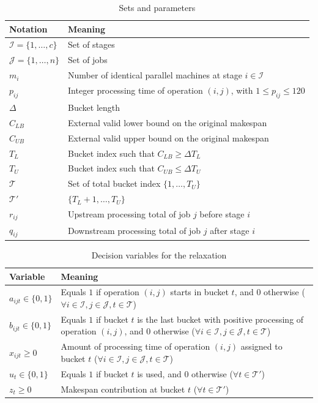 \documentclass[11pt]{article}
\begin{document}
\begin{table}[htbp]
\centering
\caption{Sets and parameters}
\label{tab:parameters}
\begin{tabular}{>{\raggedright\arraybackslash}p{} >{\raggedright\arraybackslash}p{}}
\toprule
Notation & Meaning \\
\midrule
$\mathcal{I}=\{1,\dots,c\}$ & Set of stages \\
$\mathcal{J}=\{1,\dots,n\}$ & Set of jobs \\
$m_i$ & Number of identical parallel machines at stage $i\in \mathcal{I}$ \\
$p_{ij}$ & Integer processing time of operation $(i,j)$, with $1\le p_{ij}\le 120$ \\
$\Delta$ & Bucket length \\
$C_{LB}$ & External valid lower bound on the original makespan \\
$C_{UB}$ & External valid upper bound on the original makespan \\
$T_L$ & Bucket index such that $C_{LB} \geq \Delta T_L$ \\
$T_U$ & Bucket index such that $C_{UB} \leq \Delta T_U$ \\
$\mathcal{T}$ & Set of total bucket index $\{1, \ldots, T_U\}$ \\
$\mathcal{T}'$ & $\{T_L+1, \ldots, T_U\}$ \\
$r_{ij}$ & Upstream processing total of job $j$ before stage $i$ \\
$q_{ij}$ & Downstream processing total of job $j$ after stage $i$ \\
\bottomrule
\end{tabular}
\end{table}

\begin{table}[htbp]
\centering
\caption{Decision variables for the relaxation}
\label{tab:variables}
\begin{tabular}{>{\raggedright\arraybackslash}p{} >{\raggedright\arraybackslash}p{}}
\toprule
Variable & Meaning \\
\midrule
$a_{ijt}\in\{0,1\}$ & Equals $1$ if operation $(i,j)$ starts in bucket $t$, and $0$ otherwise ($\forall i \in \mathcal{I}, j \in \mathcal{J}, t \in \mathcal{T}$) \\
$b_{ijt}\in\{0,1\}$ & Equals $1$ if bucket $t$ is the last bucket with positive processing of operation $(i,j)$, and $0$ otherwise ($\forall i \in \mathcal{I}, j \in \mathcal{J}, t \in \mathcal{T}$) \\
$x_{ijt}\ge 0$ & Amount of processing time of operation $(i,j)$ assigned to bucket $t$ ($\forall i \in \mathcal{I}, j \in \mathcal{J}, t \in \mathcal{T}$) \\
$u_t \in \{0, 1\}$ & Equals $1$ if bucket $t$ is used, and $0$ otherwise ($\forall t \in \mathcal{T}'$) \\
$z_t\ge 0$ & Makespan contribution at bucket $t$ ($\forall t \in \mathcal{T}'$) \\
\bottomrule
\end{tabular}
\end{table}
\end{document}
